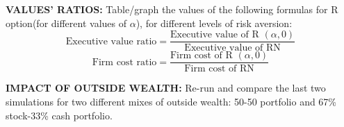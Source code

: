 \textbf{VALUES' RATIOS:}
Table/graph the values of the following formulas for R option(for different values of $\alpha$), for different levels of risk aversion:
$$\text{Executive value ratio} = \frac{\text{Executive value of R }(\alpha, 0)}{\text{Executive value of RN}}$$
$$\text{Firm cost ratio} = \frac{\text{Firm cost of R }(\alpha, 0)}{\text{Firm cost of RN}}$$
    \vspace*{20pt}


\textbf{IMPACT OF OUTSIDE WEALTH:}
Re-run and compare the last two simulations for two different mixes of outside wealth: 50-50 portfolio and 67\% stock-33\% cash portfolio.












